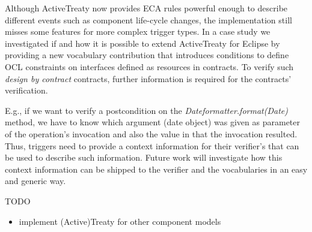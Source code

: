 \documentclass{llncs}
\begin{document}
Although ActiveTreaty now provides ECA rules powerful enough to describe different events such as component life-cycle changes, the implementation still misses some features for more complex trigger types. In a case study \cite{DAWilke} we investigated if and how it is possible to extend ActiveTreaty for Eclipse by providing a new vocabulary contribution that introduces conditions to define OCL constraints \cite{OCL20} on interfaces defined as resources in contracts. To verify such \textit{design by contract} \cite{DesignByContract} contracts, further information is required for the contracts' verification.

E.g., if we want to verify a postcondition on the \textit{Dateformatter.format(Date)} method, we have to know which argument (date object) was given as parameter of the operation's invocation and also the value in that the invocation resulted. Thus, triggers need to provide a context information for their verifier's that can be used to describe such information. Future work will investigate how this context information can be shipped to the verifier and the vocabularies in an easy and generic way.

TODO 

\begin{itemize}
	\item implement (Active)Treaty for other component models
\end{itemize}



  
    
\end{document}

